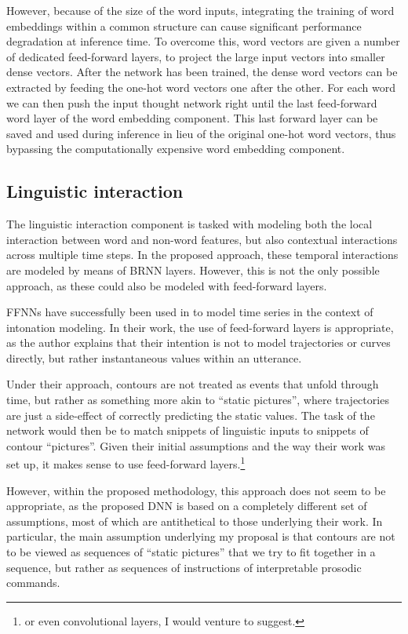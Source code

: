 However, because of the size of the word inputs, integrating the training of word embeddings within a common structure can cause significant performance degradation at inference time.
To overcome this, word vectors are given a number of dedicated feed-forward layers, to project the large input vectors into smaller dense vectors.
After the network has been trained, the dense word vectors can be extracted by feeding the one-hot word vectors one after the other.
For each word we can then push the input thought network right until the last feed-forward word layer of the word embedding component.
This last forward layer can be saved and used during inference in lieu of the original one-hot word vectors, thus bypassing the computationally expensive word embedding component.


\subsection{Linguistic interaction}

The linguistic interaction component is tasked with modeling both the local interaction between word and non-word features, but also contextual interactions across multiple time steps.
In the proposed approach, these temporal interactions are modeled by means of \ac{BRNN} layers.
However, this is not the only possible approach, as these could also be modeled with feed-forward layers. 

\acp{FFNN} have successfully been used in \citet{Vainio2001Artificial} to model time series in the context of intonation modeling. 
In their work, the use of feed-forward layers is appropriate, as the author explains that their intention is not to model trajectories or curves directly, but rather instantaneous values within an utterance.

Under their approach, contours are not treated as events that unfold through time, but rather as something more akin to ``static pictures'', where trajectories are just a side-effect of correctly predicting the static values.
The task of the network would then be to match snippets of linguistic inputs to snippets of contour ``pictures''.
Given their initial assumptions and the way their work was set up, it makes sense to use feed-forward layers.\footnote{or even convolutional layers, I would venture to suggest.}

However, within the proposed methodology, this approach does not seem to be appropriate, as the proposed \ac{DNN} is based on a completely different set of assumptions, most of which are antithetical to those underlying their work.
In particular, the main assumption underlying my proposal is that contours are not to be viewed as sequences of ``static pictures'' that we try to fit together in a sequence, but rather as sequences of instructions of interpretable prosodic commands.

